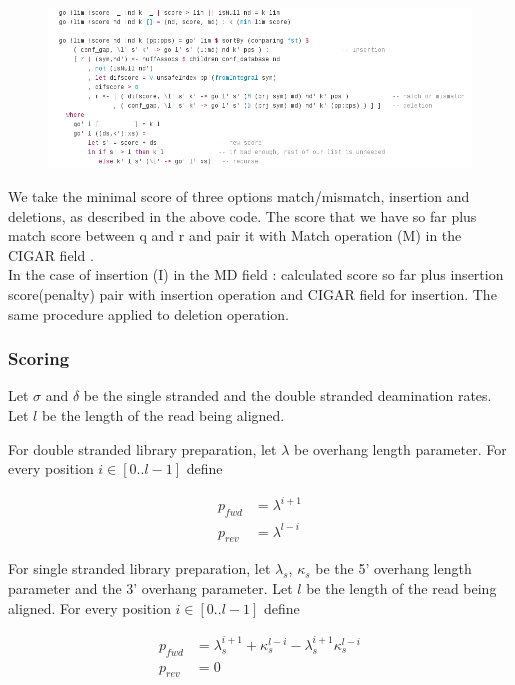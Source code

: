 \documentclass[11pt,a4paper]{report}
\begin{document}
\begin{figure}[H]
\centering
\includegraphics[width=15cm]{pictures/A_HS.png}
\label{formula}
\end{figure}


We take the minimal score of three options match/mismatch, insertion and 
deletions, as described in the above code.
The score that we have so far plus match score between q and r and pair it 
with Match operation (M) in the CIGAR field \cite{samtools}.\\
In the case of insertion (I) in the MD field \cite{samtools}: 
calculated score so far plus insertion score(penalty) pair with insertion
operation and CIGAR field for insertion.
The same procedure applied to deletion operation.

 
\subsubsection{Scoring}
Let $\sigma$ and $\delta$ be the single stranded and the double stranded
deamination rates.  Let $l$ be the length of the read being aligned.  

For double stranded library preparation, let $\lambda$ be overhang
length parameter.  For every position $i \in [0..l-1]$ define

\begin{align*}
p_{fwd} &= \lambda^{i+1} \\
p_{rev} &= \lambda^{l-i} 
\end{align*}

For single stranded library preparation, let $\lambda_s$, $\kappa_s$ be
the 5' overhang length parameter and the 3' overhang parameter.  Let $l$
be the length of the read being aligned.  For every position $i \in
[0..l-1]$ define

\begin{align*}
p_{fwd} &= \lambda_s^{i+1} + \kappa_s^{l-i} - \lambda_s^{i+1} \kappa_s^{l-i} \\
p_{rev} &= 0
\end{align*}
\end{document}
